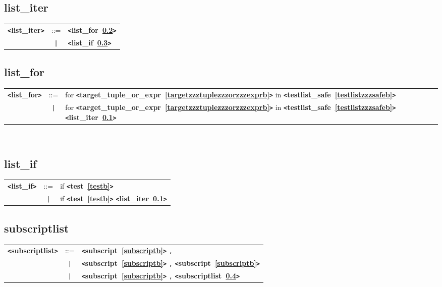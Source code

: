 \documentclass[12pt]{article}
\begin{document}
\subsection{list\_iter}
\label{listzzziterb}
\begin{tabular}{lcl}
{\bf \verb+<+list\_iter\verb+>+} & ::=  & {\bf \verb+<+list\_for~\ref{listzzzforb}\verb+>+}  \\
 & \verb+|+  & {\bf \verb+<+list\_if~\ref{listzzzifb}\verb+>+}  \\
\end{tabular}

\subsection{list\_for}
\label{listzzzforb}
\newlength{\tw}
\settowidth{\tw}{list\_for  ::=  }
\addtolength{\tw}{2\arraycolsep}
\newlength{\len}
\setlength{\len}{\textwidth}
\addtolength{\len}{-1\tw}
\begin{tabular}{lcp{\len}}
{\bf \verb+<+list\_for\verb+>+} & ::=  & for {\bf \verb+<+target\_tuple\_or\_expr~\ref{targetzzztuplezzzorzzzexprb}\verb+>+}  in {\bf \verb+<+testlist\_safe~\ref{testlistzzzsafeb}\verb+>+}  \\
 & \verb+|+  & for {\bf \verb+<+target\_tuple\_or\_expr~\ref{targetzzztuplezzzorzzzexprb}\verb+>+}  in {\bf \verb+<+testlist\_safe~\ref{testlistzzzsafeb}\verb+>+}  {\bf \verb+<+list\_iter~\ref{listzzziterb}\verb+>+}  \\
\end{tabular} \\


\subsection{list\_if}
\label{listzzzifb}
\begin{tabular}{lcl}
{\bf \verb+<+list\_if\verb+>+} & ::=  & if {\bf \verb+<+test~\ref{testb}\verb+>+}  \\
 & \verb+|+  & if {\bf \verb+<+test~\ref{testb}\verb+>+}  {\bf \verb+<+list\_iter~\ref{listzzziterb}\verb+>+}  \\
\end{tabular}

\subsection{subscriptlist}
\label{subscriptlistb}
\begin{tabular}{lcl}
{\bf \verb+<+subscriptlist\verb+>+} & ::=  & {\bf \verb+<+subscript~\ref{subscriptb}\verb+>+}  \verb|,| \\
 & \verb+|+  & {\bf \verb+<+subscript~\ref{subscriptb}\verb+>+}  \verb|,| {\bf \verb+<+subscript~\ref{subscriptb}\verb+>+}  \\
 & \verb+|+  & {\bf \verb+<+subscript~\ref{subscriptb}\verb+>+}  \verb|,| {\bf \verb+<+subscriptlist~\ref{subscriptlistb}\verb+>+}  \\
\end{tabular}
\end{document}
